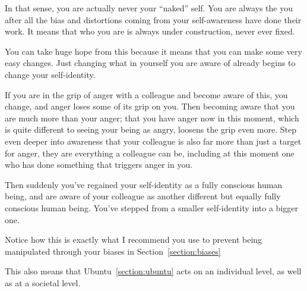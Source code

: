 In that sense, you are actually never your “naked” self. You are always the you after all the bias and distortions coming from your self-awareness have done their work. It means that who you are is always under construction, never ever fixed. 


You can take huge hope from this because it means that you can make some very easy changes. Just changing what in yourself you are aware of already begins to change your self-identity. 


If you are in the grip of anger with a colleague and become aware of this, you change, and anger loses some of its grip on you. Then becoming aware that you are much more than your anger; that you have anger now in this moment, which is quite different to seeing your being as angry, loosens the grip even more. Step even deeper into awareness that your colleague is also far more than just a target for anger, they are everything a colleague can be, including at this moment one who has done something that triggers anger in you.


Then suddenly you’ve regained your self-identity as a fully conscious human being, and are aware of your colleague as another different but equally fully conscious human being. You’ve stepped from a smaller self-identity into a bigger one. 


Notice how this is exactly what I recommend you use to prevent being manipulated through your biases in Section~\ref{section:biases}


This also means that Ubuntu~\ref{section:ubuntu} acts on an individual level, as well as at a societal level. 


